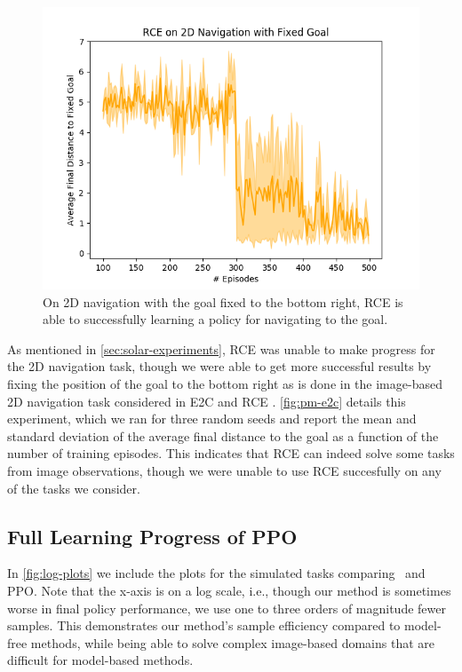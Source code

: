 \begin{figure}
    \centering
    \includegraphics[width=0.8\linewidth]{img/solar/2dnav-rce.png}
    \caption{On 2D navigation with the goal fixed to the bottom right, RCE is able to successfully learning a policy for navigating to the goal.}
    \label{fig:pm-e2c}
\end{figure}

As mentioned in \autoref{sec:solar-experiments}, RCE was unable to make progress for the 2D navigation task, though we were able to get more successful results by fixing the position of the goal to the bottom right as is done in the image-based 2D navigation task considered in E2C \citep{e2c} and RCE \citep{rce}. \autoref{fig:pm-e2c} details this experiment, which we ran for three random seeds and report the mean and standard deviation of the average final distance to the goal as a function of the number of training episodes. This indicates that RCE can indeed solve some tasks from image observations, though we were unable to use RCE succesfully on any of the tasks we consider.

\subsection{Full Learning Progress of PPO}

In \autoref{fig:log-plots} we include the plots for the simulated tasks comparing \metabbr\ and PPO. Note that the x-axis is on a log scale, i.e., though our method is sometimes worse in final policy performance, we use one to three orders of magnitude fewer samples. This demonstrates our method's sample efficiency compared to model-free methods, while being able to solve complex image-based domains that are difficult for model-based methods.

